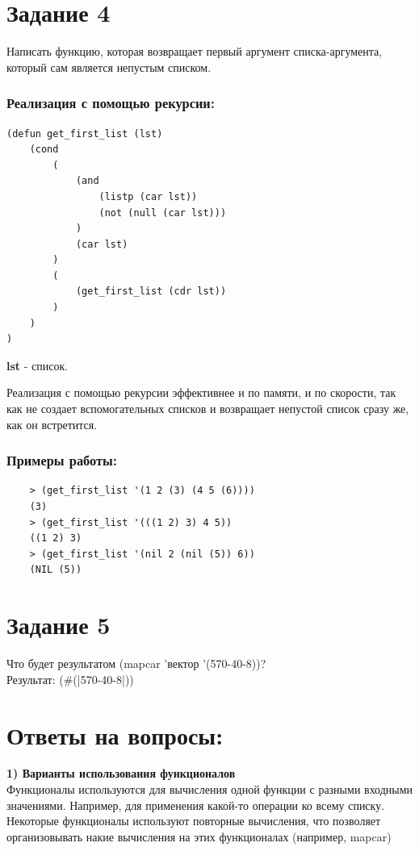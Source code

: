 \documentclass[a4paper, 12pt]{article}
\begin{document}
\section*{Задание 4}
Написать функцию, которая возвращает первый аргумент списка-аргумента, который сам является непустым списком.

\subsubsection*{Реализация с помощью рекурсии:}
\begin{lstlisting}[caption=Функция поиска первого непустого списка]
(defun get_first_list (lst)
	(cond	
		(
			(and	
				(listp (car lst))
				(not (null (car lst)))
			)
			(car lst)
		)
		(
			(get_first_list (cdr lst))
		)
	)
)
\end{lstlisting}
\textbf{lst} - список.

Реализация с помощью рекурсии эффективнее и по памяти, и по скорости, так как не создает вспомогательных списков и возвращает непустой список сразу же, как он встретится.

\subsubsection*{Примеры работы:}
\begin{lstlisting}
	> (get_first_list '(1 2 (3) (4 5 (6))))
	(3)
	> (get_first_list '(((1 2) 3) 4 5))
	((1 2) 3)
	> (get_first_list '(nil 2 (nil (5)) 6))
	(NIL (5))
\end{lstlisting}



\section*{Задание 5}
Что будет результатом (mapcar 'вектор '(570-40-8))? 
\\ Результат: (\#(|570-40-8|))



\section*{Ответы на вопросы:}
\hspace*{-7mm} \textbf{1) Варианты использования функционалов}
\\ Функционалы используются для вычисления одной функции с разными входными значениями. Например, для применения какой-то операции ко всему списку. Некоторые функционалы используют повторные вычисления, что позволяет организовывать накие вычисления на этих функционалах (например, mapcar)
\end{document}
